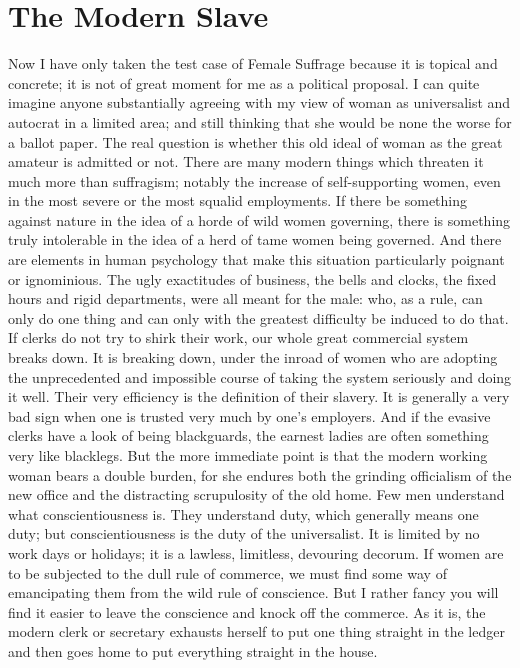 \documentclass{book}
\begin{document}
\chapter{The Modern Slave}
\label{chapter-30}
Now I have only taken the test case of Female Suffrage because it is topical and concrete; it is not of great moment for me as a political proposal. I can quite imagine anyone substantially agreeing with my view of woman as universalist and autocrat in a limited area; and still thinking that she would be none the worse for a ballot paper. The real question is whether this old ideal of woman as the great amateur is admitted or not. There are many modern things which threaten it much more than suffragism; notably the increase of self-supporting women, even in the most severe or the most squalid employments. If there be something against nature in the idea of a horde of wild women governing, there is something truly intolerable in the idea of a herd of tame women being governed. And there are elements in human psychology that make this situation particularly poignant or ignominious. The ugly exactitudes of business, the bells and clocks, the fixed hours and rigid departments, were all meant for the male: who, as a rule, can only do one thing and can only with the greatest difficulty be induced to do that. If clerks do not try to shirk their work, our whole great commercial system breaks down. It is breaking down, under the inroad of women who are adopting the unprecedented and impossible course of taking the system seriously and doing it well. Their very efficiency is the definition of their slavery. It is generally a very bad sign when one is trusted very much by one’s employers. And if the evasive clerks have a look of being blackguards, the earnest ladies are often something very like blacklegs. But the more immediate point is that the modern working woman bears a double burden, for she endures both the grinding officialism of the new office and the distracting scrupulosity of the old home. Few men understand what conscientiousness is. They understand duty, which generally means one duty; but conscientiousness is the duty of the universalist. It is limited by no work days or holidays; it is a lawless, limitless, devouring decorum. If women are to be subjected to the dull rule of commerce, we must find some way of emancipating them from the wild rule of conscience. But I rather fancy you will find it easier to leave the conscience and knock off the commerce. As it is, the modern clerk or secretary exhausts herself to put one thing straight in the ledger and then goes home to put everything straight in the house.
\end{document}
